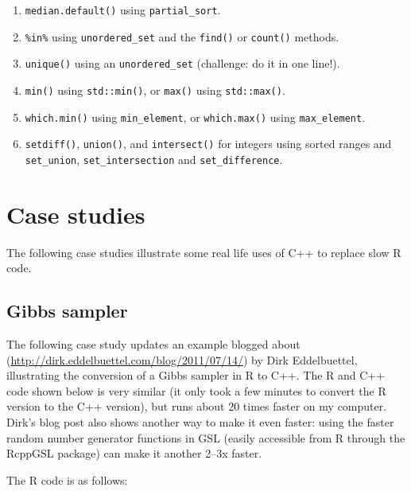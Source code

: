 \documentclass[]{book}
\renewcommand{\href}[2]{#2 (\url{#1})}
\begin{document}
\begin{enumerate}
\def\labelenumi{\arabic{enumi}.}
\item
  \texttt{median.default()} using \texttt{partial\_sort}.
\item
  \texttt{\%in\%} using \texttt{unordered\_set} and the \texttt{find()} or \texttt{count()} methods.
\item
  \texttt{unique()} using an \texttt{unordered\_set} (challenge: do it in one line!).
\item
  \texttt{min()} using \texttt{std::min()}, or \texttt{max()} using \texttt{std::max()}.
\item
  \texttt{which.min()} using \texttt{min\_element}, or \texttt{which.max()} using \texttt{max\_element}.
\item
  \texttt{setdiff()}, \texttt{union()}, and \texttt{intersect()} for integers using sorted ranges
  and \texttt{set\_union}, \texttt{set\_intersection} and \texttt{set\_difference}.
\end{enumerate}

\hypertarget{rcpp-case-studies}{%
\section{Case studies}\label{rcpp-case-studies}}

The following case studies illustrate some real life uses of C++ to replace slow R code.

\hypertarget{gibbs-sampler}{%
\subsection{Gibbs sampler}\label{gibbs-sampler}}

The following case study updates an example \href{http://dirk.eddelbuettel.com/blog/2011/07/14/}{blogged about} by Dirk Eddelbuettel, illustrating the conversion of a Gibbs sampler in R to C++. The R and C++ code shown below is very similar (it only took a few minutes to convert the R version to the C++ version), but runs about 20 times faster on my computer. Dirk's blog post also shows another way to make it even faster: using the faster random number generator functions in GSL (easily accessible from R through the RcppGSL package) can make it another 2--3x faster. 

The R code is as follows:
\end{document}
